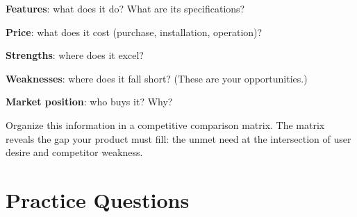 \documentclass[11pt,letterpaper,twoside,openany]{book}
\begin{document}
\textbf{Features}: what does it do? What are its specifications?

\textbf{Price}: what does it cost (purchase, installation, operation)?

\textbf{Strengths}: where does it excel?

\textbf{Weaknesses}: where does it fall short? (These are your opportunities.)

\textbf{Market position}: who buys it? Why?

Organize this information in a competitive comparison matrix. The matrix reveals the gap your product must fill: the unmet need at the intersection of user desire and competitor weakness.
\section{Practice Questions}
\end{document}
